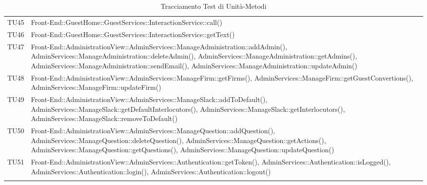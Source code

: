 \documentclass[../PianoDiQualifica.tex]{subfiles}
\begin{document}
\begin{longtable}[c] { >{\centering\arraybackslash}p{3cm} >{\centering\arraybackslash}p{9.5cm}}
			\addlinespace[0.3em]
			\midrule
			\addlinespace[0.3em]
			TU45 & Front-End::GuestHome::GuestServices::InteractionService::call() \\ 
			\addlinespace[0.3em]
			\midrule
			\addlinespace[0.3em]
			TU46 & Front-End::GuestHome::GuestServices::InteractionService::getText() \\ 		
			\addlinespace[0.3em]
			\midrule
			\addlinespace[0.3em]
			TU47 & Front-End::AdministrationView::AdminServices::ManageAdministration::addAdmin(), AdminServices::ManageAdministration::deleteAdmin(), AdminServices::ManageAdministration::getAdmins(), AdminServices::ManageAdministration::sendEmail(), AdminServices::ManageAdministration::updateAdmin() \\ 
			\addlinespace[0.3em]
			\midrule
			\addlinespace[0.3em]
			TU48 & Front-End::AdministrationView::AdminServices::ManageFirm::getFirms(), AdminServices::ManageFirm::getGuestConvertions(), AdminServices::ManageFirm::updateFirm() \\ 
			\addlinespace[0.3em]
			\midrule
			\addlinespace[0.3em]
			TU49 & Front-End::AdministrationView::AdminServices::ManageSlack::addToDefault(), AdminServices::ManageSlack::getDefaultInterlocutors(), AdminServices::ManageSlack::getInterlocutors(), AdminServices::ManageSlack::removeToDefault() \\
			\addlinespace[0.3em]
			\midrule
			\addlinespace[0.3em]
			TU50 & Front-End::AdministrationView::AdminServices::ManageQuestion::addQuestion(), AdminServices::ManageQuestion::deleteQuestion(), AdminServices::ManageQuestion::getActions(), AdminServices::ManageQuestion::getQuestions(), AdminServices::ManageQuestion::updateQuestion() \\ 
			\addlinespace[0.3em]
			\midrule
			\addlinespace[0.3em]
			TU51 & Front-End::AdministrationView::AdminServices::Authentication::getToken(), AdminServices::Authentication::isLogged(), AdminServices::Authentication::login(), AdminServices::Authentication::logout() \\ 			
			\bottomrule
			\caption{Tracciamento Test di Unità-Metodi}
	\end{longtable}

	\newpage
\end{document}
